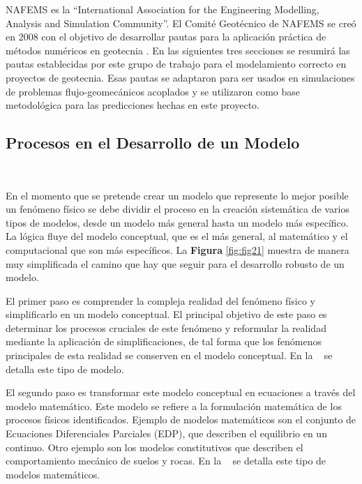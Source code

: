 NAFEMS es la “International Association for the Engineering Modelling, Analysis and Simulation Community”. El Comité Geotécnico de NAFEMS se creó en 2008 con el objetivo de desarrollar pautas para la aplicación práctica de métodos numéricos en geotecnia . En las siguientes tres secciones se resumirá las pautas establecidas por este grupo de trabajo para el modelamiento correcto en proyectos de geotecnia. Esas pautas se adaptaron para ser usados en simulaciones de problemas flujo-geomecánicos acoplados y se utilizaron como base metodológica para las predicciones hechas en este proyecto.


\subsection{Procesos en el Desarrollo de un Modelo}~\hypertarget{sec:sec231}{}
\label{sec:sec231}

En el momento que se pretende crear un modelo que represente lo mejor posible un fenómeno físico se debe dividir el proceso en la creación sistemática de varios tipos de modelos, desde un modelo más general hasta un modelo más específico. La lógica fluye del modelo conceptual, que es el más general, al matemático y el computacional que son más específicos. La \textbf{Figura} \ref{fig:fig21} muestra de manera muy simplificada el camino que hay que seguir para el desarrollo robusto de un modelo.\bigskip


El primer paso es comprender la compleja realidad del fenómeno físico y simplificarlo en un modelo conceptual. El principal objetivo de este paso es determinar los procesos cruciales de este fenómeno y reformular la realidad mediante la aplicación de simplificaciones, de tal forma que los fenómenos principales de esta realidad se conserven en el modelo conceptual. En la ~ se detalla este tipo de modelo.\bigskip

El segundo paso es transformar este modelo conceptual en ecuaciones a través del modelo matemático. Este modelo se refiere a la formulación matemática de los procesos físicos identificados. Ejemplo de modelos matemáticos son el conjunto de Ecuaciones Diferenciales Parciales (EDP), que describen el equilibrio en un continuo. Otro ejemplo son los modelos constitutivos que describen el comportamiento mecánico de suelos y rocas. En la ~ se detalla este tipo de modelos matemáticos.\bigskip

